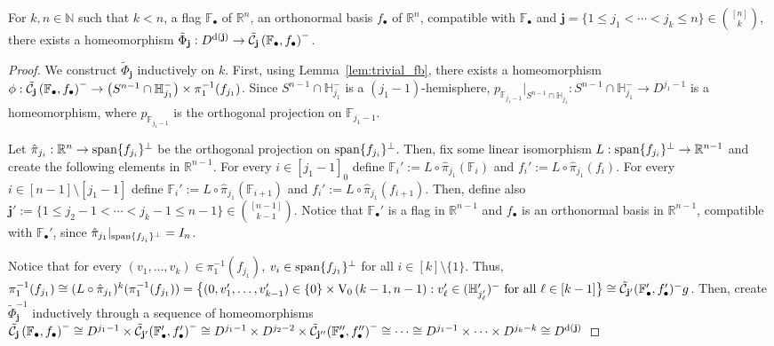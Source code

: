 \begin{lemma}\label{lem:shub_dim} For $k,n\in\mathbb{N}$ such that $k<n$, a flag $\mathbb{F}_{\bullet}$ of $\mathbb{R}^n$, an orthonormal basis $f_{\bullet}$ of $\mathbb{R}^n$, compatible with $\mathbb{F}_{\bullet}$ and $\mathbf{j}=\{1\leq j_1<\cdots<j_k\leq n\}\in\binom{[n]}{k}$, there exists a homeomorphism $\tilde{\Phi}_{\mathbf{j}}:D^{\mathrm{d}(\mathbf{j})}\to\tilde{\mathcal{C}}_{\mathbf{j}}\left(\mathbb{F}_{\bullet},f_{\bullet}\right)^-$.
\end{lemma}
\begin{proof} We construct $\tilde{\Phi}_{\mathbf{j}}$ inductively on $k$. First, using Lemma~\ref{lem:trivial_fb}, there exists a homeomorphism $\phi:\tilde{\mathcal{C}}_{\mathbf{j}}\left(\mathbb{F}_{\bullet},f_{\bullet}\right)^-\to\big(S^{n-1}\cap\mathbb{H}_{j_1}^-\big)\times\pi_1^{-1}(f_{j_1})$. Since $S^{n-1}\cap\mathbb{H}_{j_1}^-$ is a $(j_1-1)$-hemisphere, $p_{\mathbb{F}_{j_1-1}}|_{S^{n-1}\cap\mathbb{H}_{j_1}}:S^{n-1}\cap\mathbb{H}_{j_1}^-\to D^{j_1-1}$ is a homeomorphism, where $p_{\mathbb{F}_{j_1-1}}$ is the orthogonal projection on $\mathbb{F}_{j_1-1}$.

Let $\hat{\pi}_{j_i}:\mathbb{R}^n\to\mathrm{span}\{f_{j_i}\}^{\perp}$ be the orthogonal projection on $\mathrm{span}\{f_{j_i}\}^{\perp}$. Then, fix some linear isomorphism $L:\mathrm{span}\{f_{j_i}\}^{\perp}\to\mathbb{R}^{n-1}$ and create the following elements in $\mathbb{R}^{n-1}$. For every $i\in[j_1-1]_0$ define $\mathbb{F}_i':=L\circ\hat{\pi}_{j_1}(\mathbb{F}_{i})$ and $f_i':=L\circ\hat{\pi}_{j_1}(f_i)$. For every $i\in[n-1]\setminus[j_1-1]$ define $\mathbb{F}_i':=L\circ\hat{\pi}_{j_1}(\mathbb{F}_{i+1})$ and $f_i':=L\circ\hat{\pi}_{j_1}(f_{i+1})$. Then, define also $\mathbf{j}':=\{1\leq j_2-1<\cdots<j_k-1\leq n-1\}\in\binom{[n-1]}{k-1}$. Notice that $\mathbb{F}_{\bullet}'$ is a flag in $\mathbb{R}^{n-1}$ and $f_{\bullet}$ is an orthonormal basis in $\mathbb{R}^{n-1}$, compatible with $\mathbb{F}_{\bullet}'$, since $\hat{\pi}_{j_1}|_{\mathrm{span}\{f_{j_i}\}^{\perp}}=I_n$.

Notice that for every $(v_1,\ldots,v_k)\in\pi_1^{-1}(f_{j_1})$, $v_i\in\mathrm{span}\{f_{j_1}\}^{\perp}$ for all $i\in[k]\setminus\{1\}$. Thus, $\pi_1^{-1}(f_{j_1})\cong(L\circ\hat{\pi}_{j_1})^k(\pi_1^{-1}(f_{j_1}))=\big\{(0,v_1',\ldots,v_{k-1}')\in\{0\}\times\StO{k-1}{n-1}:v_{\ell}'\in(\mathbb{H}_{j'_{\ell}}')^-\text{ for all }\ell\in[k-1]\big\}\cong\tilde{\mathcal{C}}_{\mathbf{j'}}(\mathbb{F}_{\bullet}',f_{\bullet}')^-g$. Then, create $\tilde{\Phi}_{\mathbf{j}}^{-1}$ inductively through a sequence of homeomorphisms $\tilde{\mathcal{C}}_{\mathbf{j}}\left(\mathbb{F}_{\bullet},f_{\bullet}\right)^-\cong D^{j_1-1}\times\tilde{\mathcal{C}}_{\mathbf{j}'}{\left(\mathbb{F}_{\bullet}',f_{\bullet}'\right)}^-\cong D^{j_1-1}\times D^{j_2-2}\times \tilde{\mathcal{C}}_{\mathbf{j}''}{\left(\mathbb{F}_{\bullet}'',f_{\bullet}''\right)}^-\cong\cdots\cong D^{j_1-1}\times\cdots\times D^{j_k-k}\cong D^{\mathrm{d}(\mathbf{j})}$
\end{proof}

